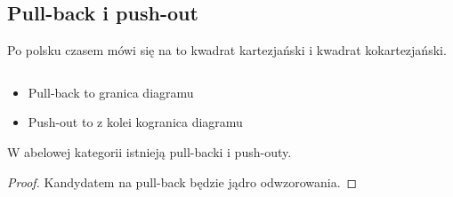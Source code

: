 \subsection{Pull-back i push-out}

Po polsku czasem mówi się na to kwadrat kartezjański i kwadrat kokartezjański.

\begin{definition}$ $\newline
  \begin{itemize}
    \item Pull-back to granica diagramu
      \begin{center}\end{center}
    \item Push-out to z kolei kogranica diagramu
      \begin{center}\end{center}
  \end{itemize}
\end{definition}

\begin{fact}
  W abelowej kategorii istnieją pull-backi i push-outy.
\end{fact}

\begin{proof}
  Kandydatem na pull-back będzie jądro odwzorowania.
\end{proof}

